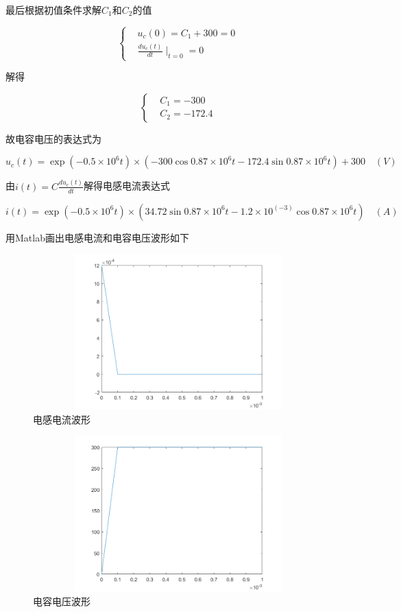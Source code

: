 \documentclass[a4paper]{article}
\begin{document}
最后根据初值条件求解$C_1$和$C_2$的值

\begin{equation}
    \begin{cases}
        &u_c(0) = C_1+300=0\\
        &\frac{du_c(t)}{dt}\mid_{t=0} = 0
    \end{cases}
\end{equation}

解得

\begin{equation}
    \begin{cases}
        &C_1 = -300\\
        &C_2 = -172.4
    \end{cases}
\end{equation}

故电容电压的表达式为

\begin{equation}
    u_{c}(t) = \exp(-0.5\times 10^{6}t)\times (-300\cos0.87\times 10^6 t-172.4\sin0.87\times 10^6 t) + 300 \quad (V)
\end{equation}

由$i(t) = C\frac{du_c(t)}{dt}$解得电感电流表达式

\begin{equation}
    i(t) = \exp(-0.5\times 10^{6}t)\times(34.72\sin0.87\times 10^6t-1.2\times 10^(-3)\cos0.87\times 10^6t)  \quad (A)
\end{equation}

用Matlab画出电感电流和电容电压波形如下

\begin{figure}[htbp]
    \centering
    \includegraphics[width=12cm,height=6cm]{current2.PNG}
    \caption{电感电流波形}
\end{figure}

\begin{figure}[htbp]
    \centering
    \includegraphics[width=12cm,height=6cm]{voltage2.PNG}
    \caption{电容电压波形}
\end{figure}
\end{document}
